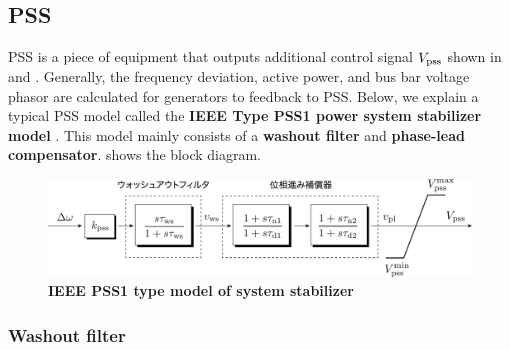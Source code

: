 \documentclass[graybox, envcountchap]{svmult}
\begin{document}
\subsection{PSS}\label{sec:pssintro}

PSS is a piece of equipment that outputs additional control signal $V_{\rm pss}$ shown in  and .
Generally, the frequency deviation, active power, and bus bar voltage phasor are calculated for generators to feedback to PSS.
Below, we explain a typical PSS model called the \textbf{IEEE Type PSS1 power system stabilizer model} \cite[Section 9.2]{ieee2016ieee}.
This model mainly consists of a \textbf{washout filter} and \textbf{phase-lead compensator}.
 shows the block diagram. 

\begin{figure}[t]
\centering
\includegraphics[width = .99\linewidth]{figs/pss1}
\medskip
\caption{\textbf{IEEE PSS1 type model of system stabilizer}}
\label{fig:pss1}
\medskip
\end{figure}


\smallskip
\subsubsection{Washout filter}
\end{document}
